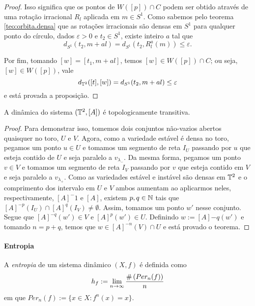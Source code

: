 \begin{proof}
Isso significa que os pontos de $W([p]) \cap C$ podem ser obtido através de uma rotação irracional $R_l$ aplicada em $m \in S^1$. Como sabemos pelo teorema \ref{teo:orbita.densa} que as rotações irracionais são densas em $S^1$ para qualquer ponto do círculo, dados $\varepsilon > 0$ e $t_2 \in S^1$, existe inteiro $a$ tal que
	\begin{equation*}
	d_{S^1}(t_2,m + al) = d_{S^1}(t_2,R_l^a(m)) \leq \varepsilon \text{.}
	\end{equation*}

Por fim, tomando $[w]=[t_1,m+al]$, temos $[w] \in W([p]) \cap C$; ou seja, $[w] \in W([p])$, vale
	\begin{equation*}
	d_{\mathbb{T}^2}([t],[w]) = d_{S^1}(t_2,m+al) \leq \varepsilon
	\end{equation*}
e está provada a proposição.
\end{proof}


\begin{theorem}
A dinâmica do sistema $(\mathbb{T}^2, [A])$ é topologicamente transitiva.
\end{theorem}
\begin{proof}
Para demonstrar isso, tomemos dois conjuntos não-vazios abertos quaisquer no toro, $U$ e $V$. Agora, como a variedade estável é densa no toro, pegamos um ponto $u \in U$ e tomamos um segmento de reta $I_U$ passando por $u$ que esteja contido de $U$ e seja paralelo a $v_{\lambda_-}$. Da mesma forma, pegamos um ponto $v \in V$ e tomamos um segmento de reta $I_V$ passando por $v$ que esteja contido em $V$ e seja paralelo a $v_{\lambda_+}$. Como as variedades estável e instável são densas em $\mathbb{T}^2$ e o comprimento dos intervalo em $U$ e $V$ ambos aumentam ao aplicarmos neles, respectivamente, $[A]^-1$ e $[A]$, existem $p,q \in \mathbb{N}$ tais que $[A]^{-p}(I_U) \cap [A]^q(I_V) \neq \emptyset$. Assim, tomamos um ponto $w'$ nesse conjunto. Segue que $[A]^{-q}(w') \in V$ e $[A]^p(w') \in U$. Definindo $w := [A]{-q}(w')$ e tomando $n=p+q$, temos que $w \in [A]^{-n}(V) \cap U$ e está provado o teorema.
\end{proof}


\paragraph{Entropia}

\begin{definition}
A \textit{entropia} de um sistema dinâmico $(X,f)$ é definida como
	\begin{equation*}
	h_f := \lim_{n \to \infty} \frac{\#\left({Per_n(f)}\right)}{n}
	\end{equation*}
em que $Per_n(f) := \{x \in X : f^n(x)=x\}$.
\end{definition}

